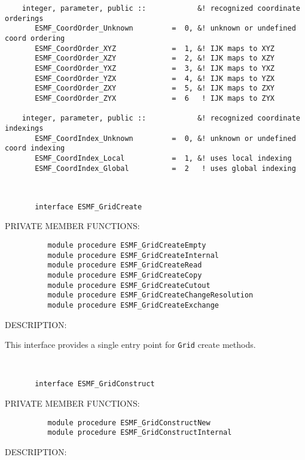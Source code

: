 \begin{verbatim}
    integer, parameter, public ::            &! recognized coordinate orderings
       ESMF_CoordOrder_Unknown         =  0, &! unknown or undefined coord ordering
       ESMF_CoordOrder_XYZ             =  1, &! IJK maps to XYZ
       ESMF_CoordOrder_XZY             =  2, &! IJK maps to XZY
       ESMF_CoordOrder_YXZ             =  3, &! IJK maps to YXZ
       ESMF_CoordOrder_YZX             =  4, &! IJK maps to YZX
       ESMF_CoordOrder_ZXY             =  5, &! IJK maps to ZXY
       ESMF_CoordOrder_ZYX             =  6   ! IJK maps to ZYX
 
    integer, parameter, public ::            &! recognized coordinate indexings
       ESMF_CoordIndex_Unknown         =  0, &! unknown or undefined coord indexing
       ESMF_CoordIndex_Local           =  1, &! uses local indexing
       ESMF_CoordIndex_Global          =  2   ! uses global indexing
 \end{verbatim}
 
 
\mbox{}\hrulefill\ 
 

\begin{verbatim}       interface ESMF_GridCreate
 \end{verbatim}{\sf PRIVATE MEMBER FUNCTIONS:}
\begin{verbatim}          module procedure ESMF_GridCreateEmpty
          module procedure ESMF_GridCreateInternal
          module procedure ESMF_GridCreateRead
          module procedure ESMF_GridCreateCopy
          module procedure ESMF_GridCreateCutout
          module procedure ESMF_GridCreateChangeResolution
          module procedure ESMF_GridCreateExchange
 \end{verbatim}
{\sf DESCRIPTION:\\ }


       This interface provides a single entry point for {\tt Grid} create
       methods.
   
 
\mbox{}\hrulefill\ 
 

\begin{verbatim}       interface ESMF_GridConstruct
 \end{verbatim}{\sf PRIVATE MEMBER FUNCTIONS:}
\begin{verbatim}          module procedure ESMF_GridConstructNew
          module procedure ESMF_GridConstructInternal
 \end{verbatim}
{\sf DESCRIPTION:\\ }


